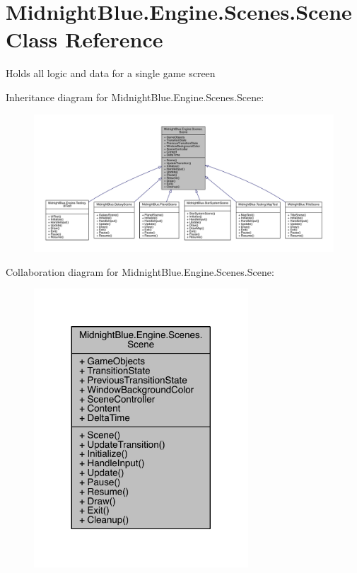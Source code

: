 \hypertarget{class_midnight_blue_1_1_engine_1_1_scenes_1_1_scene}{}\section{Midnight\+Blue.\+Engine.\+Scenes.\+Scene Class Reference}
\label{class_midnight_blue_1_1_engine_1_1_scenes_1_1_scene}


Holds all logic and data for a single game screen  




Inheritance diagram for Midnight\+Blue.\+Engine.\+Scenes.\+Scene\+:
\nopagebreak
\begin{figure}[H]
\begin{center}
\leavevmode
\includegraphics[width=350pt]{class_midnight_blue_1_1_engine_1_1_scenes_1_1_scene__inherit__graph}
\end{center}
\end{figure}


Collaboration diagram for Midnight\+Blue.\+Engine.\+Scenes.\+Scene\+:
\nopagebreak
\begin{figure}[H]
\begin{center}
\leavevmode
\includegraphics[width=227pt]{class_midnight_blue_1_1_engine_1_1_scenes_1_1_scene__coll__graph}
\end{center}
\end{figure}
